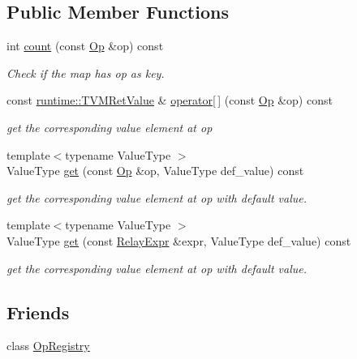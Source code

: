 \subsection*{Public Member Functions}
\begin{DoxyCompactItemize}
\item 
int \hyperlink{classtvm_1_1GenericOpMap_aae9ad079762cba7d1ea7875734992506}{count} (const \hyperlink{classtvm_1_1Op}{Op} \&op) const 
\begin{DoxyCompactList}\small\item\em Check if the map has op as key. \end{DoxyCompactList}\item 
const \hyperlink{classtvm_1_1runtime_1_1TVMRetValue}{runtime\+::\+T\+V\+M\+Ret\+Value} \& \hyperlink{classtvm_1_1GenericOpMap_a74e4a7eab2bf83c8b505e4942b5b7516}{operator\mbox{[}$\,$\mbox{]}} (const \hyperlink{classtvm_1_1Op}{Op} \&op) const 
\begin{DoxyCompactList}\small\item\em get the corresponding value element at op \end{DoxyCompactList}\item 
{\footnotesize template$<$typename Value\+Type $>$ }\\Value\+Type \hyperlink{classtvm_1_1GenericOpMap_a9adaf806540db27a3eb334a599fb8cb5}{get} (const \hyperlink{classtvm_1_1Op}{Op} \&op, Value\+Type def\+\_\+value) const 
\begin{DoxyCompactList}\small\item\em get the corresponding value element at op with default value. \end{DoxyCompactList}\item 
{\footnotesize template$<$typename Value\+Type $>$ }\\Value\+Type \hyperlink{classtvm_1_1GenericOpMap_a204ef8651b7ec324ed2fbec84217a8fa}{get} (const \hyperlink{classtvm_1_1RelayExpr}{Relay\+Expr} \&expr, Value\+Type def\+\_\+value) const 
\begin{DoxyCompactList}\small\item\em get the corresponding value element at op with default value. \end{DoxyCompactList}\end{DoxyCompactItemize}
\subsection*{Friends}
\begin{DoxyCompactItemize}
\item 
class \hyperlink{classtvm_1_1GenericOpMap_af7ebaf5af32d51226208f533e6d5cb1d}{Op\+Registry}
\end{DoxyCompactItemize}


